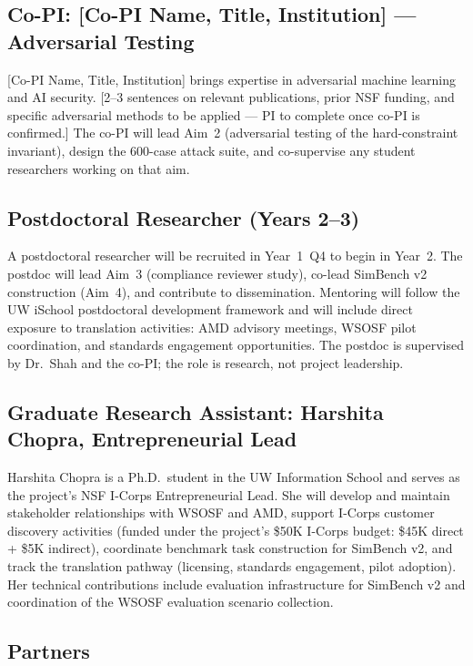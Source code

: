 \documentclass[11pt]{article}
\newcommand{\copiname}{[Co-PI Name, Title, Institution]}
\begin{document}
\subsection{Co-PI: \copiname{} --- Adversarial Testing}

\copiname{} brings expertise in adversarial machine learning and AI security. [2--3 sentences on relevant publications, prior NSF funding, and specific adversarial methods to be applied --- PI to complete once co-PI is confirmed.] The co-PI will lead Aim~2 (adversarial testing of the hard-constraint invariant), design the 600-case attack suite, and co-supervise any student researchers working on that aim.

\subsection{Postdoctoral Researcher (Years 2--3)}

A postdoctoral researcher will be recruited in Year~1~Q4 to begin in Year~2. The postdoc will lead Aim~3 (compliance reviewer study), co-lead SimBench v2 construction (Aim~4), and contribute to dissemination. Mentoring will follow the UW iSchool postdoctoral development framework and will include direct exposure to translation activities: AMD advisory meetings, WSOSF pilot coordination, and standards engagement opportunities. The postdoc is supervised by Dr.\ Shah and the co-PI; the role is research, not project leadership.

\subsection{Graduate Research Assistant: Harshita Chopra, Entrepreneurial Lead}

Harshita Chopra is a Ph.D.\ student in the UW Information School and serves as the project's NSF I-Corps Entrepreneurial Lead. She will develop and maintain stakeholder relationships with WSOSF and AMD, support I-Corps customer discovery activities (funded under the project's \$50K I-Corps budget: \$45K direct + \$5K indirect), coordinate benchmark task construction for SimBench v2, and track the translation pathway (licensing, standards engagement, pilot adoption). Her technical contributions include evaluation infrastructure for SimBench v2 and coordination of the WSOSF evaluation scenario collection.

\subsection{Partners}
\end{document}
